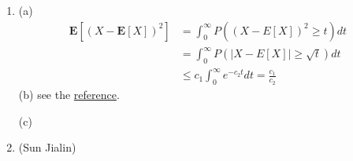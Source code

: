 \begin{enumerate}
	(b) By Cauchy-Schwarz inequality, $ \bm{E}[e^{\lambda(X_{1}+X_{2})}] \leq (\bm{E}e^{2\lambda X_{1}}\bm{E}e^{2\lambda X_{2}})^{\frac{1}{2}} \leq e^{\lambda^{2}(\sigma^{2}_{1}+\sigma^{2}_{2})} $
	
	(c) By Jensen's inequality, \[\begin{split}
	    \bm{E}[\exp\{\lambda(X_{1}+X_{2})\}] & = \bm{E}[\exp\{\frac{\sigma_{1}}{\sigma_{1}+\sigma_{2}}(\frac{\sigma_{1}+\sigma_{2}}{\sigma_{1}}\lambda X_{1})+\frac{\sigma_{2}}{\sigma_{1}+\sigma_{2}}(\frac{\sigma_{1}+\sigma_{2}}{\sigma_{2}}\lambda X_{2})\}]\\ &\leq \frac{\sigma_{1}}{\sigma_{1}+\sigma_{2}}e^{(\sigma_{1}+\sigma_{2})^{2}\lambda^{2}/2}+ \frac{\sigma_{2}}{\sigma_{1}+\sigma_{2}}e^{(\sigma_{1}+\sigma_{2})^{2}\lambda^{2}/2}\\&= e^{(\sigma_{1}+\sigma_{2})^{2}\lambda^{2}/2}
	\end{split}  \]
	(d) (Xiong)
	\begin{align*}
	    \bm{E}\left[e^{\lambda X_1X_2}\right] &\leq \bm{E}\left[e^{\frac{\lambda^2 X_1^2}{2}\sigma_2^2}\right], \quad\quad(\mbox{by independecne of $X_1$ and $X_2$})\\
	    &\leq  \frac{1}{\sqrt{1 - \lambda^2 \sigma_1^2 \sigma_2^2}}, \quad\quad(\mbox{by IV in Theorem 2.6}) \\
	    &= e^{-\frac{1}{2}\ln{(1 - \lambda^2 \sigma_1^2\sigma_2^2)}} \\
	    &\leq e^\frac{\lambda^2 \sigma_1^2\sigma_2^2}{2(1 - \lambda^2\sigma_1^2\sigma_2^2)}, \quad\quad(\mbox{by $\ln{1 - x} \geq \frac{-x}{1 - x}$}) \\
	    &\leq e^{\lambda^2 \sigma_1^2 \sigma_2^2}, \quad\quad(\mbox{for $|\lambda| \leq \frac{1}{\sqrt{2}\sigma_1\sigma_2}$})
	\end{align*}
	
	\item
	(a) 
	\begin{align*}
	    \bm{E}\left[\left(X - \bm{E}[X]\right)^2\right] &= \int_{0}^{\infty} P\left(\left(X - E[X]\right)^2 \geq t\right)dt \\
	    &=\int_{0}^{\infty} P\left(\left|X - E[X]\right| \geq \sqrt{t}\right)dt \\
	    &\leq  c_1 \int_{0}^{\infty}e^{-c_2t}dt = \frac{c_1}{c_2}
	\end{align*}
	(b) see the \href{https://math.stackexchange.com/questions/3144688/mean-concentration-implies-median-concentration}{reference}.
	
	(c)
	\item
	(Sun Jialin)
	

\end{enumerate}
